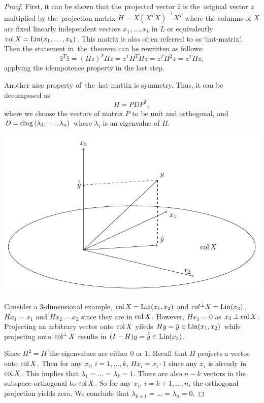 \begin{proof}
First, it can be shown that the~projected vector $\hat z$ is the~original vector $z$
multiplied by the~projection matrix $H = X(X^T X)^{-1}X^T$ where the columns of $X$
are fixed linearly independent vectors $x_1, \ldots, x_k$ in $L$
or equivalently $\operatorname{col} X = \operatorname{Lin}(x_1, \ldots, x_k)$.
This matrix is  also often referred to as `hat-matrix'.
Then the statement in~the~theorem can be rewritten as follows:
\[
\hat z^T \hat z = (Hz)^T Hz = z^T H^T H z = z^T H^2 z = z^T H z,
\]
applying the idempotence property in the last step.

Another nice property of~the~hat-mattix is symmetry.
Thus, it can be decomposed as
\[
H = P D P^T,
\]
where we choose the vectors of matrix $P$ to be unit and orthogonal,
and $D = \operatorname{diag}{(\lambda_1, \ldots, \lambda_n)}$ where $\lambda_i$ is an eigenvalue of $H$.

\begin{marginfigure}
  \includegraphics[width=\linewidth]{figures/04_chi_squared_example.pdf}
  \caption{Consider a $3$-dimensional example, $\operatorname{col} X = \operatorname{Lin}(x_1, x_2)$ and $col^{\perp}X = \operatorname{Lin}(x_3)$.
  $H x_1 = x_1$ and $H x_2 = x_2$ since they are in $\operatorname{col} X$. However, $H x_3 = 0$ as $x_3 \perp \operatorname{col} X$.
  Projecting an arbitrary vector onto $\operatorname{col} X$ yileds $Hy = \hat y \in \operatorname{Lin}(x_1, x_2)$
  while projecting onto $\operatorname{col}^{\perp}X$ results in $(I-H)y = \hat{\hat y} \in \operatorname{Lin}(x_3)$.}
\end{marginfigure}

Since $H^2 = H$ the eigenvalues are either $0$ or $1$.
Recall that $H$ projects a vector onto $\operatorname{col} X$.
Then for any $x_i$, $i = 1, \ldots, k$, $H x_i = x_i \cdot 1$ since
any $x_i$ is already in $\operatorname{col} X$. This implies that $\lambda_1 = \ldots = \lambda_k = 1$.
There are also $n-k$ vectors in the subspace orthogonal to $\operatorname{col} X$.
So for any $x_i$, $i= k+1, \ldots, n$, the orthogonal projection yields zero.
We conclude that $\lambda_{k+1} = \ldots = \lambda_n = 0$.


\end{proof}
